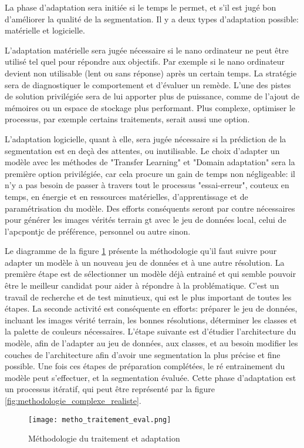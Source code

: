 ﻿\par La phase d'adaptation sera initiée si le temps le permet, et s'il est jugé bon d'améliorer la qualité de la segmentation. Il y a deux types d'adaptation possible: matérielle et logicielle.
\par L'adaptation matérielle sera jugée nécessaire si le nano ordinateur ne peut être utilisé tel quel pour répondre aux objectifs. Par exemple si le nano ordinateur devient non utilisable (lent ou sans réponse) après un certain temps. La stratégie sera de diagnostiquer le comportement et d'évaluer un remède. L'une des pistes de solution privilégiée sera de lui apporter plus de puissance, comme de l'ajout de mémoires ou un espace de stockage plus performant. Plus complexe, optimiser le processus, par exemple certains traitements, serait aussi une option.
\par L'adaptation logicielle, quant à elle, sera jugée nécessaire si la prédiction de la segmentation est en deçà des attentes, ou inutilisable. Le choix d'adapter un modèle avec les méthodes de "Transfer Learning" et "Domain adaptation" sera la première option privilégiée, car cela procure un gain de temps non négligeable: il n'y a pas besoin de passer à travers tout le processus "essai-erreur", couteux en temps, en énergie et en ressources matérielles, d'apprentissage et de paramétrisation du modèle. Des efforts conséquents seront par contre nécessaires pour générer les images vérités terrain \acrshort{gt} avec le jeu de données local, celui de l'\acrlong{apcpontjc} de préférence, personnel ou autre sinon.
\par Le diagramme de la figure \ref{fig:metho_adaptation} présente la méthodologie qu'il faut suivre pour adapter un modèle à un nouveau jeu de données et à une autre résolution. La première étape est de sélectionner un modèle déjà entrainé et qui semble pouvoir être le meilleur candidat pour aider à répondre à la problématique. C'est un travail de recherche et de test minutieux, qui est le plus important de toutes les étapes. La seconde activité est conséquente en efforts: préparer le jeu de données, incluant les images vérité terrain, les bonnes résolutions, déterminer les classes et la palette de couleurs nécessaires. L'étape suivante est d'étudier l'architecture du modèle, afin de l'adapter au jeu de données, aux classes, et au besoin modifier les couches de l'architecture afin d'avoir une segmentation la plus précise et fine possible. Une fois ces étapes de préparation complétées, le ré entrainement du modèle peut s'effectuer, et la segmentation évaluée. Cette phase d'adaptation est un processus itératif, qui peut être représenté par la figure \ref{fig:methodologie_complexe_realiste}.
\label{metho_adaptation}
\begin{figure}[H]
    \centering
    \texttt{[image: metho\_traitement\_eval.png]}
    \caption{Méthodologie du traitement et adaptation}
    \label{fig:metho_adaptation}
\end{figure}